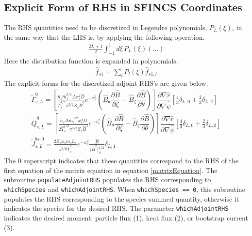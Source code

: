 \documentclass[11pt]{amsart}
\newcommand{\partder}[2]{\dfrac{\partial #1}{\partial #2}} %
\begin{document}
\subsection{Explicit Form of RHS in SFINCS Coordinates}
The RHS quantities need to be discretized in Legendre polynomials, $P_L(\xi)$, in the same way that the LHS is, by applying the following operation. 
\begin{gather}
\frac{2L+1}{2} \int_{-1}^1 d \xi \, P_L(\xi) ( ... )
\end{gather}
Here the distribution function is expanded in polynomials.
\begin{gather}
\hat{f}_{s1} = \sum_l P_l(\xi) \hat{f}_{s1,l}
\end{gather}
The explicit forms for the discretized adjoint RHS's are given below.
\begin{gather}
\tilde{\Gamma}^0_{s,L} = \left[ \frac{\hat{n}_s \hat{m}_s^{3/2} \Delta x_s^2 \hat{D}}{\hat{T}_s^{3/2} \pi^{3/2} Z_s \hat{B}^3 } e^{-x_s^2} \left( \hat{B}_{\theta} \partder{\hat{B}}{\zeta} - \hat{B}_{\zeta} \partder{\hat{B}}{\theta} \right) \right] \partder{ \nabla \hat{r}}{\nabla \hat{\psi}} \left[ \frac{4}{3} \delta_{L,0} + \frac{2}{3} \delta_{L,2} \right] \\
\tilde{Q}^0_{s,L} =  \left[ \frac{\hat{n}_s \Delta \hat{m}_s^{3/2} x_s^4 \hat{D}}{2 \hat{T}_s^{1/2} \pi^{3/2} Z_s \hat{B}^3 } e^{-x_s^2} \left( \hat{B}_{\theta} \partder{\hat{B}}{\zeta} - \hat{B}_{\zeta} \partder{\hat{B}}{\theta} \right) \right] \partder{ \nabla \hat{r}}{\nabla \hat{\psi}} \left[ \frac{4}{3} \delta_{L,0} + \frac{2}{3} \delta_{L,2} \right] \\
\tilde{J}_{s,L}^{bs,0} =  \frac{2 Z_s x_s \hat{m}_s \hat{n}_s} {\pi^{3/2} \hat{T}_s^{2}} e^{-x_s^2}\frac{\hat{B}}{\langle \hat{B}^2 \rangle_{\psi}^{1/2}} \delta_{L,1}
\end{gather}
The 0 superscript indicates that these quantities correspond to the RHS of the first equation of the matrix equation in equation \ref{matrixEquation}. The subroutine \texttt{populateAdjointRHS} populates the RHS corresponding to \texttt{whichSpecies} and \texttt{whichAdjointRHS}. When \texttt{whichSpecies == 0}, this subroutine populates the RHS corresponding to the species-summed quantity, otherwise it indicates the species for the desired RHS. The parameter \texttt{whichAdjointRHS} indicates the desired moment: particle flux (1), heat flux (2), or bootstrap current (3). 
\end{document}
